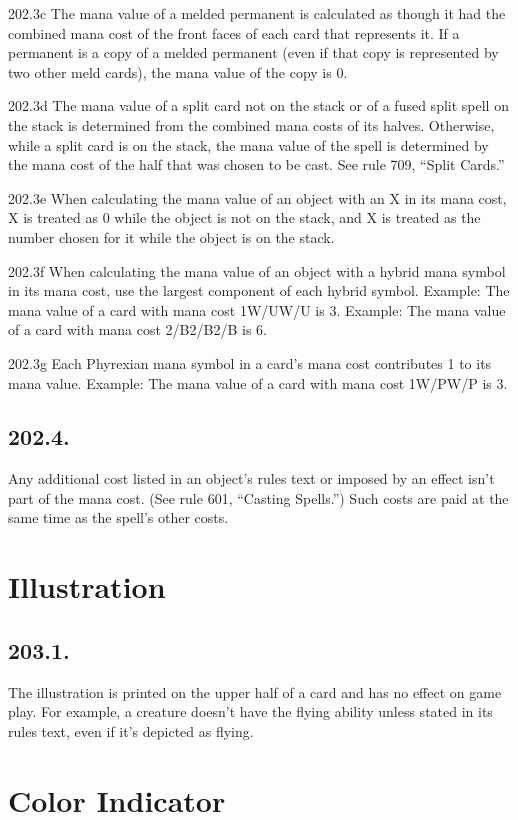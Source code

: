 202.3c The mana value of a melded permanent is calculated as though it had the combined mana cost of the front faces of each card that represents it. If a permanent is a copy of a melded permanent (even if that copy is represented by two other meld cards), the mana value of the copy is 0.

202.3d The mana value of a split card not on the stack or of a fused split spell on the stack is determined from the combined mana costs of its halves. Otherwise, while a split card is on the stack, the mana value of the spell is determined by the mana cost of the half that was chosen to be cast. See rule 709, “Split Cards.”

202.3e When calculating the mana value of an object with an {X} in its mana cost, X is treated as 0 while the object is not on the stack, and X is treated as the number chosen for it while the object is on the stack.

202.3f When calculating the mana value of an object with a hybrid mana symbol in its mana cost, use the largest component of each hybrid symbol.
Example: The mana value of a card with mana cost {1}{W/U}{W/U} is 3.
Example: The mana value of a card with mana cost {2/B}{2/B}{2/B} is 6.

202.3g Each Phyrexian mana symbol in a card’s mana cost contributes 1 to its mana value.
Example: The mana value of a card with mana cost {1}{W/P}{W/P} is 3.

\subsection*{202.4.}
Any additional cost listed in an object’s rules text or imposed by an effect isn’t part of the mana cost. (See rule 601, “Casting Spells.”) Such costs are paid at the same time as the spell’s other costs.

\section{Illustration}
\subsection*{203.1.}
The illustration is printed on the upper half of a card and has no effect on game play. For example, a creature doesn’t have the flying ability unless stated in its rules text, even if it’s depicted as flying.

\section{Color Indicator}
